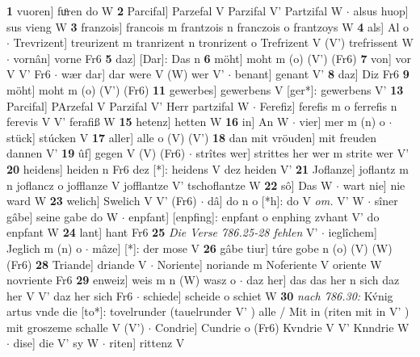 \documentclass[8pt,a4paper,notitlepage]{article}
\begin{document}
\begin{table}[ht]
\begin{minipage}[t]{0.5\linewidth}
\textbf{1} vuoren] fuͦren do W \textbf{2} Parcifal] Parzefal V Parzifal V' Partzifal W  $\cdot$ alsus huop] sus vieng W \textbf{3} franzois] francois m frantzois n franczois o frantzoys W \textbf{4} als] Al o  $\cdot$ Trevrizent] treurizent m tranrizent n tronrizent o Trefrizent V (V') trefrissent W  $\cdot$ vornân] vorne Fr6 \textbf{5} daz] [Dar]: Das n \textbf{6} möht] moht m (o) (V') (Fr6) \textbf{7} von] vor V V' Fr6  $\cdot$ wær dar] dar were V (W) wer V'  $\cdot$ benant] genant V' \textbf{8} daz] Diz Fr6 \textbf{9} möht] moht m (o) (V') (Fr6) \textbf{11} gewerbes] gewerbens V [ger*]: gewerbens V' \textbf{13} Parcifal] PArzefal V Parzifal V' Herr partzifal W  $\cdot$ Ferefiz] ferefis m o ferrefis n ferevis V V' ferafiß W \textbf{15} hetenz] hetten W \textbf{16} in] An W  $\cdot$ vier] mer m (n) o  $\cdot$ stück] stúcken V \textbf{17} aller] alle o (V) (V') \textbf{18} dan mit vröuden] mit freuden dannen V' \textbf{19} ûf] gegen V (V) (Fr6)  $\cdot$ strîtes wer] strittes her wer m strite wer V' \textbf{20} heidens] heiden n Fr6 dez [*]: heidens V dez heiden V' \textbf{21} Joflanze] joflantz m n joflancz o jofflanze V jofflantze V' tschoflantze W \textbf{22} sô] Das W  $\cdot$ wart nie] nie ward W \textbf{23} welich] Swelich V V' (Fr6)  $\cdot$ dâ] do n o [*h]: do V \textit{om.} V' W  $\cdot$ sîner gâbe] seine gabe do W  $\cdot$ enpfant] [enpfing]: enpfant o enphing zvhant V' do enpfant W \textbf{24} lant] hant Fr6 \textbf{25} \textit{Die Verse 786.25-28 fehlen} V'   $\cdot$ ieglîchem] Jeglich m (n) o  $\cdot$ mâze] [*]: der mose V \textbf{26} gâbe tiur] túre gobe n (o) (V) (W) (Fr6) \textbf{28} Triande] driande V  $\cdot$ Noriente] noriande m Noferiente V oriente W novriente Fr6 \textbf{29} enweiz] weis m n (W) wasz o  $\cdot$ daz her] das das her n sich daz her V V' daz her sich Fr6  $\cdot$ schiede] scheide o schiet W \textbf{30} \textit{nach 786.30:} Kv́nig artus vnde die [to*]: tovelrunder (tauelrunder V'  ) alle / Mit in (riten mit in V'  ) mit groszeme schalle V (V')   $\cdot$ Condrie] Cundrie o (Fr6) Kvndrie V V' Knndrie W  $\cdot$ dise] die V' sy W  $\cdot$ riten] rittenz V \newline
\end{minipage}
\end{table}
\newpage
\end{document}
